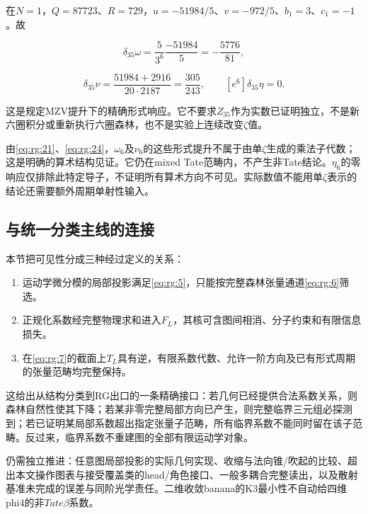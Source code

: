 \documentclass[11pt,a4paper,oneside]{ctexart}
\theoremstyle{cnplain}
\theoremstyle{definition}
\theoremstyle{remark}
\newcommand{\tightlist}{\setlength{\itemsep}{0pt}\setlength{\parskip}{0pt}}
\numberwithin{equation}{section}
\begin{document}
在\(N=1\)，\(Q=87723\)、\(R=729\)，\(u=-51984/5\)、\(v=-972/5\)、\(b_1=3\)、\(c_1=-1\)。故

\begin{equation}
[e^6]\delta_{35}\omega=\frac5{3^6}\frac{-51984}5
      =-\frac{5776}{81},
\end{equation}

\begin{equation}
[e^6]\delta_{35}\nu
   =\frac{51984+2916}{20\cdot2187}
   =\frac{305}{243},\qquad [e^6]\delta_{35}\eta=0.   \label{eq:rg:24}
\end{equation}

这是规定MZV提升下的精确形式响应。它不要求\(Z_{35}\)作为实数已证明独立，不是新六圈积分或重新执行六圈森林，也不是实验上连续改变\(\zeta\)值。

由\eqref{eq:rg:21}、\eqref{eq:rg:24}，\(\omega _6\)及\(\nu _6\)的这些形式提升不属于由单\(\zeta\)生成的乘法子代数；这是明确的算术结构见证。它仍在mixed Tate范畴内，不产生非Tate结论。\(\eta _6\)的零响应仅排除此特定导子，不证明所有算术方向不可见。实际数值不能用单\(\zeta\)表示的结论还需要额外周期单射性输入。


\subsection{与统一分类主线的连接}\label{sec:rg:8}

本节把可见性分成三种经过定义的关系：

\begin{enumerate}
\def\labelenumi{\arabic{enumi}.}
\tightlist
\item
  运动学微分模的局部投影满足\eqref{eq:rg:5}，只能按完整森林张量通道\eqref{eq:rg:6}筛选。
\item
  正规化系数经完整物理求和进入\(F_L\)，其核可含图间相消、分子约束和有限信息损失。
\item
  在\eqref{eq:rg:7}的截面上\(T_L\)具有逆，有限系数代数、允许一阶方向及已有形式周期的张量范畴均完整保持。
\end{enumerate}

这给出从结构分类到RG出口的一条精确接口：若几何已经提供合法系数关系，则森林自然性使其下降；若某非零完整局部方向已产生，则完整临界三元组必探测到；若已证明某局部系数超出指定张量子范畴，所有临界系数不能同时留在该子范畴。反过来，临界系数不重建图的全部有限运动学对象。

仍需独立推进：任意图局部投影的实际几何实现、收缩与法向锥/吹起的比较、超出本文操作图表与接受覆盖类的head/角色接口、一般多耦合完整读出，以及散射基准未完成的误差与同阶光学责任。二维收敛banana的K3最小性不自动给四维phi4的非\(Tate \beta\)系数。
\end{document}
